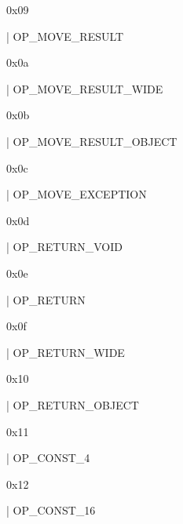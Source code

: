\documentclass[11pt]{article}
\begin{document}
\begin{ocamldoccomment}
0x09
\end{ocamldoccomment}
\begin{ocamldoccode}
  | OP_MOVE_RESULT
\end{ocamldoccode}
\begin{ocamldoccomment}
0x0a
\end{ocamldoccomment}
\begin{ocamldoccode}
  | OP_MOVE_RESULT_WIDE
\end{ocamldoccode}
\begin{ocamldoccomment}
0x0b
\end{ocamldoccomment}
\begin{ocamldoccode}
  | OP_MOVE_RESULT_OBJECT
\end{ocamldoccode}
\begin{ocamldoccomment}
0x0c
\end{ocamldoccomment}
\begin{ocamldoccode}
  | OP_MOVE_EXCEPTION
\end{ocamldoccode}
\begin{ocamldoccomment}
0x0d
\end{ocamldoccomment}
\begin{ocamldoccode}
  | OP_RETURN_VOID
\end{ocamldoccode}
\begin{ocamldoccomment}
0x0e
\end{ocamldoccomment}
\begin{ocamldoccode}
  | OP_RETURN
\end{ocamldoccode}
\begin{ocamldoccomment}
0x0f
\end{ocamldoccomment}
\begin{ocamldoccode}
  | OP_RETURN_WIDE
\end{ocamldoccode}
\begin{ocamldoccomment}
0x10
\end{ocamldoccomment}
\begin{ocamldoccode}
  | OP_RETURN_OBJECT
\end{ocamldoccode}
\begin{ocamldoccomment}
0x11
\end{ocamldoccomment}
\begin{ocamldoccode}
  | OP_CONST_4
\end{ocamldoccode}
\begin{ocamldoccomment}
0x12
\end{ocamldoccomment}
\begin{ocamldoccode}
  | OP_CONST_16
\end{ocamldoccode}
\end{document}
